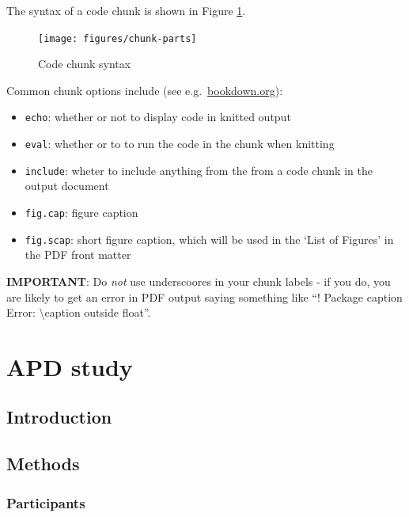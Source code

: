 \documentclass[a4paper, twoside]{templates/ociamthesis}
\providecommand{\tightlist}{%
  \setlength{\itemsep}{0pt}\setlength{\parskip}{0pt}}
\begin{document}
The syntax of a code chunk is shown in Figure \ref{fig:chunk-parts}.

\begin{figure}
\texttt{[image: figures/chunk-parts]} \caption{Code chunk syntax}\label{fig:chunk-parts}
\end{figure}

Common chunk options include (see e.g.~\href{https://bookdown.org/yihui/rmarkdown/r-code.html}{bookdown.org}):

\begin{itemize}
\tightlist
\item
  \texttt{echo}: whether or not to display code in knitted output
\item
  \texttt{eval}: whether or to to run the code in the chunk when knitting
\item
  \texttt{include}: wheter to include anything from the from a code chunk in the output document
\item
  \texttt{fig.cap}: figure caption
\item
  \texttt{fig.scap}: short figure caption, which will be used in the `List of Figures' in the PDF front matter
\end{itemize}

\textbf{IMPORTANT}: Do \emph{not} use underscoores in your chunk labels - if you do, you are likely to get an error in PDF output saying something like ``! Package caption Error: \textbackslash caption outside float''.

\hypertarget{APD-study}{%
\chapter{APD study}\label{APD-study}}


\minitoc 

\hypertarget{introduction-4}{%
\section{Introduction}\label{introduction-4}}

\hypertarget{methods-4}{%
\section{Methods}\label{methods-4}}

\hypertarget{participants}{%
\subsection{Participants}\label{participants}}
\end{document}

